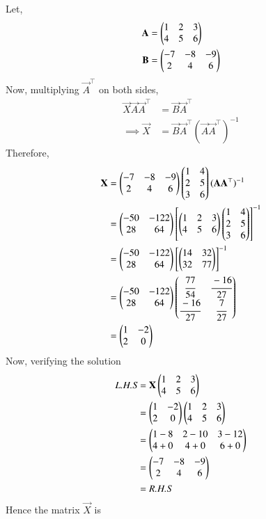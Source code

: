 Let,
\begin{align}
    \mathbf{A} &= \begin{pmatrix}1 & 2 & 3\\ 4 & 5 & 6\end{pmatrix}\\
    \mathbf{B} &= \begin{pmatrix}-7 & -8 & -9\\ 2 & 4 & 6\end{pmatrix}
\end{align}
Now, multiplying $\vec{A}^\top$ on both sides,
\begin{align}
    \vec{X}\vec{A}\vec{A}^\top &= \vec{B}\vec{A}^\top\\
   \implies \vec{X} &= \vec{B}\vec{A}^\top(\vec{A}\vec{A}^\top)^{-1}
\end{align}
Therefore,
\begin{align}
    \mathbf{X} &= \begin{pmatrix}-7 & -8 & -9\\ 2 & 4 & 6\end{pmatrix} \begin{pmatrix}1 & 4\\2 & 5\\3 & 6\end{pmatrix}(\mathbf{A}\mathbf{A}^\top)^{-1}\\
            &= \begin{pmatrix}-50 & -122\\ 28 & 64\end{pmatrix} \left[\begin{pmatrix}1 & 2 & 3\\ 4 & 5 & 6\end{pmatrix} \begin{pmatrix}1 & 4\\2 & 5\\3 & 6\end{pmatrix}\right]^{-1}\\
            &= \begin{pmatrix}-50 & -122\\ 28 & 64\end{pmatrix}\left[\begin{pmatrix}14 & 32\\32 & 77\end{pmatrix}\right]^{-1}\\
            &= \begin{pmatrix}-50 & -122\\ 28 & 64\end{pmatrix}\begin{pmatrix}\cfrac{77}{54}&\cfrac{-16}{27}\\ \cfrac{-16}{27}& \cfrac{7}{27}\end{pmatrix}\\
            &= \begin{pmatrix}1 & -2\\2 & 0\end{pmatrix}
\end{align}
Now, verifying the solution
\begin{align}
    \textit{L.H.S} &= \mathbf{X}\begin{pmatrix}1 & 2 & 3\\ 4 & 5 & 6\end{pmatrix}\\
                 &= \begin{pmatrix}1 & -2\\2 & 0\end{pmatrix}\begin{pmatrix}1 & 2 & 3\\ 4 & 5 & 6\end{pmatrix}\\
                 &= \begin{pmatrix}1-8 & 2-10 & 3-12\\4+0 & 4+0 & 6+0\end{pmatrix}\\
                 &= \begin{pmatrix}-7 & -8 & -9\\2 & 4 & 6\end{pmatrix}\\
                 &= \textit{R.H.S}
\end{align}
Hence the matrix $\vec{X}$ is 